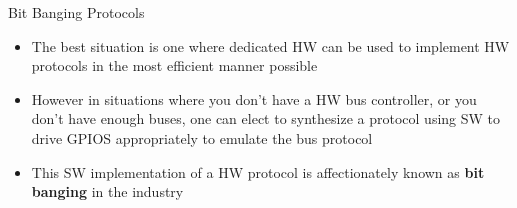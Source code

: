 \begin{frame}
   {Bit Banging Protocols}
   \begin{itemize}
      \item The best situation is one where dedicated HW can be used to implement
	      HW protocols in the most efficient manner possible
      \item However in situations where you don't have a HW bus controller, or you
	      don't have enough buses, one can elect to synthesize a protocol
              using SW to drive GPIOS appropriately to emulate the bus protocol
      \item This SW implementation of a HW protocol is affectionately known as
	      \textbf{bit banging} in the industry
   \end{itemize}
\end{frame}

\cprotect\note{


}

